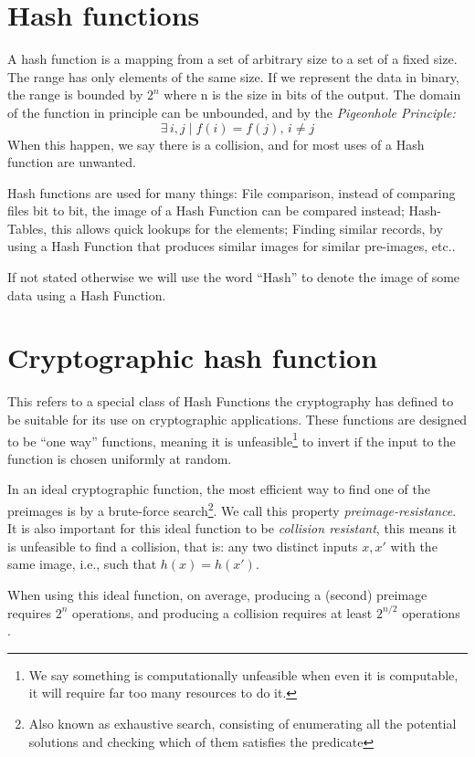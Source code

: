 \section{Hash functions}
A hash function is a mapping from a set of arbitrary size to a set of a fixed
  size.
The range has only elements of the same size.
If we represent the data in binary, the range is bounded by $2^n$ where n
  is the size in bits of the output.
The domain of the function in principle can be unbounded, and by the
  \textit{Pigeonhole Principle:}
\begin{equation}
    \mathit{\exists \, i, j \mid f(i) = f(j), \, i \neq j}
\end{equation}
When this happen, we say there is a collision, and for most uses of a Hash
  function are unwanted.

Hash functions are used for many things: File comparison, instead of comparing
  files bit to bit, the image of a Hash Function can be compared instead;
  Hash-Tables, this allows quick lookups for the elements; Finding similar
  records, by using a Hash Function that produces similar images for similar
  pre-images, etc..

If not stated otherwise we will use the word ``Hash'' to denote the image of
  some data using a Hash Function.

\section{Cryptographic hash function}
This refers to a special class of Hash Functions the cryptography has defined
  to be suitable for its use on cryptographic applications. These functions are
  designed to be ``one way'' functions, meaning it is unfeasible\footnote{We %
  say something is computationally unfeasible when even it is computable, it
  will require far too many resources to do it.} to invert if the input to the
  function is chosen uniformly at random.

In an ideal cryptographic function, the most efficient way to find one of the
  preimages is by a brute-force search\footnote{Also known as exhaustive search,
  consisting of enumerating all the potential solutions and checking which of
  them satisfies the predicate}. We call this property
  \textit{preimage-resistance}.
It is also important for this ideal function to be \textit{collision
  resistant}, this means it is unfeasible to find a collision, that is: any two
  distinct inputs $x, x'$ with the same image, i.e., such that $h(x) = h(x')$.

When using this ideal function, on average, producing a (second) preimage
  requires $2^n$ operations, and producing a collision requires at least
  $2^{n / 2} $ operations \cite{preneel1993analysis}.
